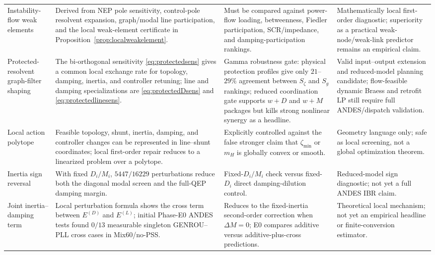 \documentclass[journal]{IEEEtran}
\begin{document}
\begin{table}[t]
\begin{tabular}{@{}p{}p{}p{}p{}@{}}
Instability-flow weak elements
& Derived from NEP pole sensitivity, control-pole resolvent expansion, graph/modal line participation, and the local weak-element certificate in Proposition~\ref{prop:localweakelement}.
& Must be compared against power-flow loading, betweenness, Fiedler participation, SCR/impedance, and damping-participation rankings.
& Mathematically local first-order diagnostic; superiority as a practical weak-node/weak-link predictor remains an empirical claim.\\
Protected-resolvent graph-filter shaping
& The bi-orthogonal sensitivity \eqref{eq:protectedsens} gives a common local exchange rate for topology, damping, inertia, and controller retuning; line and damping specializations are \eqref{eq:protectedDsens} and \eqref{eq:protectedlinesens}.
& Gamma robustness gate: physical protection profiles give only $21$--$29\%$ agreement between $S_\zeta$ and $S_g$ rankings; reduced coordination gate supports $w+D$ and $w+M$ packages but kills strong nonlinear synergy as a headline.
& Valid input--output extension and reduced-model planning candidate; flow-feasible dynamic Braess and retrofit LP still require full ANDES/dispatch validation.\\
Local action polytope
& Feasible topology, shunt, inertia, damping, and controller changes can be represented in line--shunt coordinates; local first-order repair reduces to a linearized problem over a polytope.
& Explicitly controlled against the false stronger claim that $\zeta_{\min}$ or $m_H$ is globally convex or smooth.
& Geometry language only; safe as local screening, not a global optimization theorem.\\
Inertia sign reversal
& With fixed $D_i/M_i$, $5447/16229$ perturbations reduce both the diagonal modal screen and the full-QEP damping margin.
& Fixed-$D_i/M_i$ check versus fixed-$D_i$ direct damping-dilution control.
& Reduced-model sign diagnostic; not yet a full ANDES IBR claim.\\
Joint inertia--damping term
& Local perturbation formula shows the cross term between $E^{(D)}$ and $E^{(L)}$; initial Phase-E0 ANDES tests found $0/13$ measurable singleton GENROU--PLL cross cases in Mix60/no-PSS.
& Reduces to the fixed-inertia second-order correction when $\Delta M=0$; E0 compares additive versus additive-plus-cross predictions.
& Theoretical local mechanism; not yet an empirical headline or finite-conversion estimator.\\
\bottomrule
\end{tabular}
\end{table}
\end{document}
